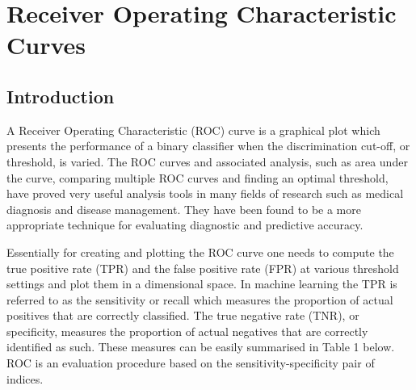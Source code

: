 \chapter{Receiver Operating Characteristic Curves}
\label{ch:roc-curves}

\section{Introduction}
\noindent A Receiver Operating Characteristic (ROC) curve is a graphical plot which presents the performance of a binary classifier when the discrimination cut-off, or threshold, is varied. The ROC curves and associated analysis, such as area under the curve, comparing multiple ROC curves and finding an optimal threshold, have proved very useful analysis tools in many fields of research such as medical diagnosis and disease management. They have been found to be a more appropriate technique for evaluating diagnostic and predictive accuracy.

Essentially for creating and plotting the ROC curve one needs to compute the true positive rate (TPR) and the false positive rate (FPR) at various threshold settings and plot them in a dimensional space. In machine learning the TPR is referred to as the sensitivity or recall which measures the proportion of actual positives that are correctly classified. The true negative rate (TNR), or specificity, measures the proportion of actual negatives that are correctly identified as such. These measures can be easily summarised in Table 1 below. ROC is an evaluation procedure based on the sensitivity-specificity pair of indices.

